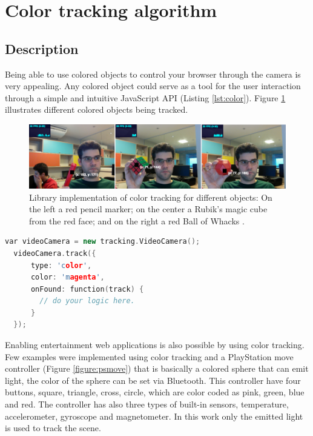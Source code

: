 

\section{Color tracking algorithm} %
\label{sec:evaluation:color_tracking_algorithm}

\subsection{Description} %
\label{sub:evaluation:results:color_tracking_algorithm:description}

Being able to use colored objects to control your browser through the camera is very appealing. Any colored object could serve as a tool for the user interaction through a simple and intuitive JavaScript API (Listing \ref{lst:color}). Figure \ref{figure:color_object} illustrates different colored objects being tracked.

\begin{figure}[!htb]
  \centering
  \includegraphics[width=\linewidth]{chapters/evaluation/color_object.png}
  \caption{Library implementation of color tracking for different objects: On the left a red pencil marker; on the center a Rubik's magic cube \cite{Rubiks2013} from the red face; and on the right a red Ball of Whacks \cite{Whack2013}.}
  \label{figure:color_object}
\end{figure}

\newpage

\begin{lstlisting}[language=C++,label={lst:color},caption=Example of \textit{tracking.js} color API.]
  var videoCamera = new tracking.VideoCamera();
  videoCamera.track({
      type: 'color',
      color: 'magenta',
      onFound: function(track) {
        // do your logic here.
      }
  });
\end{lstlisting}

Enabling entertainment web applications is also possible by using color tracking. Few examples were implemented using color tracking and a PlayStation move controller (Figure \ref{figure:psmove}) that is basically a colored sphere that can emit light, the color of the sphere can be set via Bluetooth. This controller have four buttons, square, triangle, cross, circle, which are color coded as pink, green, blue and red. The controller has also three types of built-in sensors, temperature, accelerometer, gyroscope and magnetometer. In this work only the emitted light is used to track the scene.

